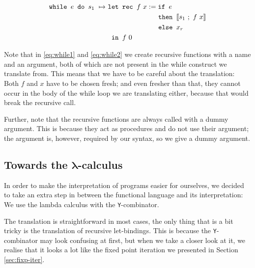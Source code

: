 \documentclass[11pt, leqno, titlepage]{article}
\theoremstyle{definition}
\begin{document}
\begin{align}
  \texttt{while } e \texttt{ do } s_1
                    ~\mapsto~ & \texttt{let rec } f~x :=
                                 \texttt{if } e \label{eq:while2}\\
                    & \phantom{{}=11111111111}\texttt{ then } \llbracket s_1 ~;~ f~x \rrbracket\notag\\
                    & \phantom{{}=11111111111}\texttt{ else } x_r \notag\\
                    & \texttt{ in } f~0\notag
\end{align}

Note that in \ref{eq:while1} and \ref{eq:while2} we create recursive functions with a
name and an argument, both of which are not present in the while construct we
translate from. This means that we have to be careful about the translation: Both $f$
and $x$ have to be chosen fresh; and even fresher than that, they cannot occur in
the body of the while loop we are translating either, because that would break the
recursive call.

Further, note that the recursive functions are always called with a dummy
argument. This is because they act as procedures and do not use their argument; the
argument is, however, required by our syntax, so we give a dummy argument.


\subsection{Towards the $\mathbf{\lambda}$-calculus}\label{sec:fun-to-lambda}  

In order to make the interpretation of programs easier for ourselves, we decided to
take an extra step in between the functional language and its interpretation: We use
the lambda calculus with the \texttt{Y}-combinator.

The translation is straightforward in most cases, the only thing that is a bit tricky
is the translation of recursive let-bindings. This is because the
\texttt{Y}-combinator may look confusing at first, but when we take a closer look at
it, we realise that it looks a lot like the fixed point iteration we presented in
Section \ref{sec:fixp-iter}.
\end{document}
